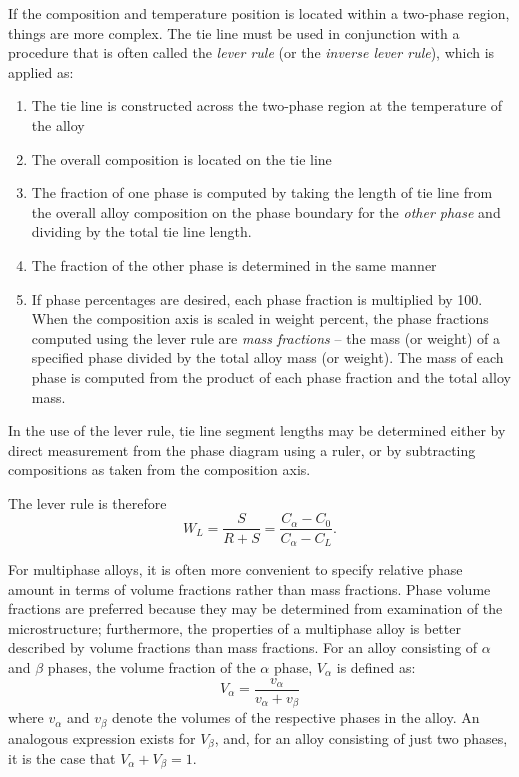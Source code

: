 If the composition and temperature position is located within a two-phase region, things are more complex. The tie line must be used in conjunction with a procedure that is often called the \textit{lever rule} (or the \textit{inverse lever rule}), which is applied as:
\begin{enumerate}
  \item The tie line is constructed across the two-phase region at the temperature of the alloy
  \item The overall composition is located on the tie line
  \item The fraction of one phase is computed by taking the length of tie line from the overall alloy composition on the phase boundary for the \textit{other phase} and dividing by the total tie line length.
  \item The fraction of the other phase is determined in the same manner
  \item If phase percentages are desired, each phase fraction is multiplied by 100. When the composition axis is scaled in weight percent, the phase fractions computed using the lever rule are \textit{mass fractions} -- the mass (or weight) of a specified phase divided by the total alloy mass (or weight). The mass of each phase is computed from the product of each phase fraction and the total alloy mass.
\end{enumerate}
In the use of the lever rule, tie line segment lengths may be determined either by direct measurement from the phase diagram using a ruler, or by subtracting compositions as taken from the composition axis.

The lever rule is therefore
\[ 
W_L = \frac{S}{R + S} = \frac{C_{\alpha} - C_0}{C_{\alpha} - C_L}
.\]

For multiphase alloys, it is often more convenient to specify relative phase amount in terms of volume fractions rather than mass fractions. Phase volume fractions are preferred because they may be determined from examination of the microstructure; furthermore, the properties of a multiphase alloy is better described by volume fractions than mass fractions. For an alloy consisting of $\alpha$ and $\beta$ phases, the volume fraction of the $\alpha$ phase, $V_{\alpha}$ is defined as:
\[ 
V_{\alpha} = \frac{v_{\alpha}}{v_{\alpha} + v_{\beta}}
\]
where $v_{\alpha}$ and $v_{\beta}$ denote the volumes of the respective phases in the alloy. An analogous expression exists for $V_{\beta}$, and, for an alloy consisting of just two phases, it is the case that $V_{\alpha} + V_{\beta} = 1$. 

